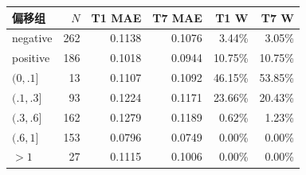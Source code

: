 \begin{inlinetable}
\centering
\caption{105,000 次适配迭代后的经验偏移子集误差统计，按符号与幅度区间划分。MAE 单位为 DN，W 为相对于未校正时误差增大的样本比例。各分量来自八个场景。}\label{tab:buckets}
\footnotesize
\setlength{\tabcolsep}{3pt}
\begin{tabular}{lrrrrr}
\toprule
偏移组 & $N$ & T1 MAE & T7 MAE & T1 W & T7 W \\
\midrule
negative & 262 & 0.1138 & 0.1076 & 3.44\% & 3.05\% \\
positive & 186 & 0.1018 & 0.0944 & 10.75\% & 10.75\% \\
$(0,.1]$ & 13 & 0.1107 & 0.1092 & 46.15\% & 53.85\% \\
$(.1,.3]$ & 93 & 0.1224 & 0.1171 & 23.66\% & 20.43\% \\
$(.3,.6]$ & 162 & 0.1279 & 0.1189 & 0.62\% & 1.23\% \\
$(.6,1]$ & 153 & 0.0796 & 0.0749 & 0.00\% & 0.00\% \\
$>1$ & 27 & 0.1115 & 0.1006 & 0.00\% & 0.00\% \\
\bottomrule
\end{tabular}
\end{inlinetable}

